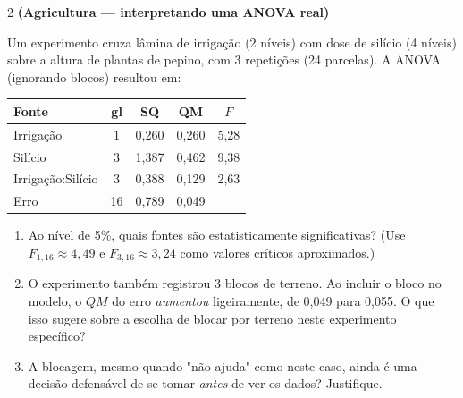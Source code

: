 \documentclass[11pt]{article}
\begin{document}
\begin{questao}{2} \textbf{(Agricultura --- interpretando uma ANOVA real)}

Um experimento cruza lâmina de irrigação (2 níveis) com dose de silício (4 níveis) sobre a altura
de plantas de pepino, com 3 repetições (24 parcelas). A ANOVA (ignorando blocos) resultou em:

\begin{center}
\begin{tabular}{lcccc}
\toprule
Fonte & gl & SQ & QM & $F$ \\ \midrule
Irrigação & 1 & 0,260 & 0,260 & 5,28 \\
Silício & 3 & 1,387 & 0,462 & 9,38 \\
Irrigação:Silício & 3 & 0,388 & 0,129 & 2,63 \\
Erro & 16 & 0,789 & 0,049 & \\ \bottomrule
\end{tabular}
\end{center}

\begin{enumerate}[label=(\alph*)]
  \item Ao nível de 5\%, quais fontes são estatisticamente significativas? (Use $F_{1,16} \approx
    4{,}49$ e $F_{3,16}\approx3{,}24$ como valores críticos aproximados.)
  \item O experimento também registrou 3 blocos de terreno. Ao incluir o bloco no modelo, o
    $QM$ do erro \emph{aumentou} ligeiramente, de 0,049 para 0,055. O que isso sugere sobre a
    escolha de blocar por terreno neste experimento específico?
  \item A blocagem, mesmo quando "não ajuda" como neste caso, ainda é uma decisão defensável de
    se tomar \emph{antes} de ver os dados? Justifique.
\end{enumerate}
\end{questao}
\end{document}
